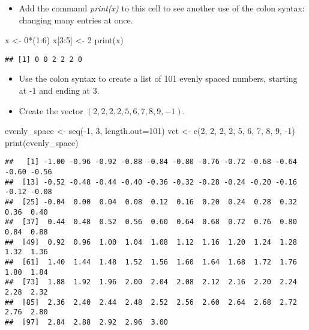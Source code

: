 \documentclass[
]{article}
\newenvironment{Shaded}{\begin{snugshade}}{\end{snugshade}}
\newcommand{\AttributeTok}[1]{\textcolor[rgb]{0.77,0.63,0.00}{#1}}
\newcommand{\DecValTok}[1]{\textcolor[rgb]{0.00,0.00,0.81}{#1}}
\newcommand{\FunctionTok}[1]{\textcolor[rgb]{0.00,0.00,0.00}{#1}}
\newcommand{\NormalTok}[1]{#1}
\newcommand{\OtherTok}[1]{\textcolor[rgb]{0.56,0.35,0.01}{#1}}
\newcommand{\SpecialCharTok}[1]{\textcolor[rgb]{0.00,0.00,0.00}{#1}}
\providecommand{\tightlist}{%
  \setlength{\itemsep}{0pt}\setlength{\parskip}{0pt}}
\begin{document}
\begin{itemize}
\tightlist
\item
  Add the command \emph{print(x)} to this cell to see another use of the
  colon syntax: changing many entries at once.
\end{itemize}

\begin{Shaded}
\begin{Highlighting}[]
\NormalTok{x }\OtherTok{\textless{}{-}} \DecValTok{0}\SpecialCharTok{*}\NormalTok{(}\DecValTok{1}\SpecialCharTok{:}\DecValTok{6}\NormalTok{)}
\NormalTok{x[}\DecValTok{3}\SpecialCharTok{:}\DecValTok{5}\NormalTok{] }\OtherTok{\textless{}{-}} \DecValTok{2}
\FunctionTok{print}\NormalTok{(x)}
\end{Highlighting}
\end{Shaded}

\begin{verbatim}
## [1] 0 0 2 2 2 0
\end{verbatim}

\begin{itemize}
\item
  Use the colon syntax to create a list of 101 evenly spaced numbers,
  starting at -1 and ending at 3.
\item
  Create the vector \((2,2,2,2,5,6,7,8,9,-1)\).
\end{itemize}

\begin{Shaded}
\begin{Highlighting}[]
\NormalTok{evenly\_space }\OtherTok{\textless{}{-}} \FunctionTok{seq}\NormalTok{(}\SpecialCharTok{{-}}\DecValTok{1}\NormalTok{, }\DecValTok{3}\NormalTok{, }\AttributeTok{length.out=}\DecValTok{101}\NormalTok{)}
\NormalTok{vct }\OtherTok{\textless{}{-}} \FunctionTok{c}\NormalTok{(}\DecValTok{2}\NormalTok{, }\DecValTok{2}\NormalTok{, }\DecValTok{2}\NormalTok{, }\DecValTok{2}\NormalTok{, }\DecValTok{5}\NormalTok{, }\DecValTok{6}\NormalTok{, }\DecValTok{7}\NormalTok{, }\DecValTok{8}\NormalTok{, }\DecValTok{9}\NormalTok{, }\SpecialCharTok{{-}}\DecValTok{1}\NormalTok{)}
\FunctionTok{print}\NormalTok{(evenly\_space)}
\end{Highlighting}
\end{Shaded}

\begin{verbatim}
##   [1] -1.00 -0.96 -0.92 -0.88 -0.84 -0.80 -0.76 -0.72 -0.68 -0.64 -0.60 -0.56
##  [13] -0.52 -0.48 -0.44 -0.40 -0.36 -0.32 -0.28 -0.24 -0.20 -0.16 -0.12 -0.08
##  [25] -0.04  0.00  0.04  0.08  0.12  0.16  0.20  0.24  0.28  0.32  0.36  0.40
##  [37]  0.44  0.48  0.52  0.56  0.60  0.64  0.68  0.72  0.76  0.80  0.84  0.88
##  [49]  0.92  0.96  1.00  1.04  1.08  1.12  1.16  1.20  1.24  1.28  1.32  1.36
##  [61]  1.40  1.44  1.48  1.52  1.56  1.60  1.64  1.68  1.72  1.76  1.80  1.84
##  [73]  1.88  1.92  1.96  2.00  2.04  2.08  2.12  2.16  2.20  2.24  2.28  2.32
##  [85]  2.36  2.40  2.44  2.48  2.52  2.56  2.60  2.64  2.68  2.72  2.76  2.80
##  [97]  2.84  2.88  2.92  2.96  3.00
\end{verbatim}
\end{document}
